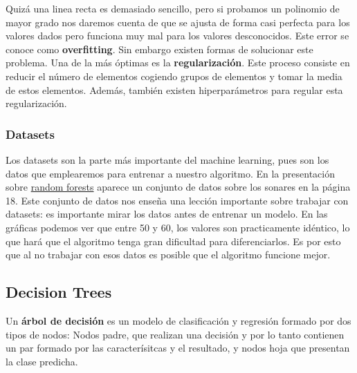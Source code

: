 \documentclass[11pt]{article}
\theoremstyle{plain}
\begin{document}
                 Quizá una linea recta es demasiado sencillo, pero si probamos un polinomio de mayor grado nos daremos cuenta de que se ajusta de forma casi perfecta para los valores dados pero funciona muy mal para los valores desconocidos. Este error se conoce como \textbf{overfitting}. Sin embargo existen formas de solucionar este problema. Una de la más óptimas es la \textbf{regularización}. Este proceso consiste en reducir el número de elementos cogiendo grupos de elementos y tomar la media de estos elementos. Además, también existen hiperparámetros para regular esta regularización.
            \subsubsection{Datasets} %
            \label{subsub:datasets}
                Los datasets son la parte más importante del machine learning, pues son los datos que emplearemos para entrenar a nuestro algoritmo. En la presentación sobre \href{https://e-aules.uab.cat/2022-23/pluginfile.php/644137/course/section/76903/introduction_random_forests.pdf?time=1677161999564}{random forests} aparece un conjunto de datos sobre los sonares en la página 18. Este conjunto de datos nos enseña una lección importante sobre trabajar con datasets: es importante mirar los datos antes de entrenar un modelo. En las gráficas podemos ver que entre 50 y 60, los valores son practicamente idéntico, lo que hará que el algoritmo tenga gran dificultad para diferenciarlos. Es por esto que al no trabajar con esos datos es posible que el algoritmo funcione mejor.
        \subsection{Decision Trees} %
        \label{sub:decision_trees}
            Un \textbf{árbol de decisión} es un modelo de clasificación y regresión formado por dos tipos de nodos: Nodos padre, que realizan una decisión y por lo tanto contienen un par formado por las caracterísitcas y el resultado, y nodos hoja que presentan la clase predicha.\\
\end{document}
